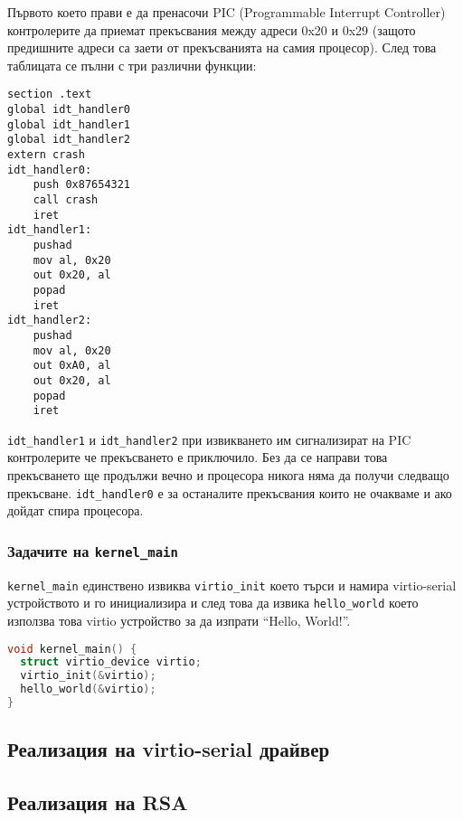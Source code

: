 Първото което прави е да пренасочи PIC (Programmable Interrupt Controller) контролерите да приемат прекъсвания между адреси 0x20 и 0x29 (защото предишните адреси са заети от прекъсванията на самия процесор). След това таблицата се пълни с три различни функции:
\begin{lstlisting}
section .text
global idt_handler0
global idt_handler1
global idt_handler2
extern crash
idt_handler0:
    push 0x87654321
    call crash
    iret
idt_handler1:
    pushad
    mov al, 0x20
    out 0x20, al
    popad
    iret
idt_handler2:
    pushad
    mov al, 0x20
    out 0xA0, al
    out 0x20, al
    popad
    iret
\end{lstlisting}
{\tt idt\_handler1} и {\tt idt\_handler2} при извикването им сигнализират на PIC контролерите че прекъсването е приключило. Без да се направи това прекъсването ще продължи вечно и процесора никога няма да получи следващо прекъсване. {\tt idt\_handler0} е за останалите прекъсвания които не очакваме и ако дойдат спира процесора.

\subsubsection{Задачите на {\tt kernel\_main}}
{\tt kernel\_main} единствено извиква {\tt virtio\_init} което търси и намира virtio-serial устройството и го инициализира и след това да извика {\tt hello\_world} което използва това virtio устройство за да изпрати ``Hello, World!''.
\begin{lstlisting}[language=C]
void kernel_main() {
  struct virtio_device virtio;
  virtio_init(&virtio);
  hello_world(&virtio);
}
\end{lstlisting}

\subsection{Реализация на virtio-serial драйвер}

\subsection{Реализация на RSA}

